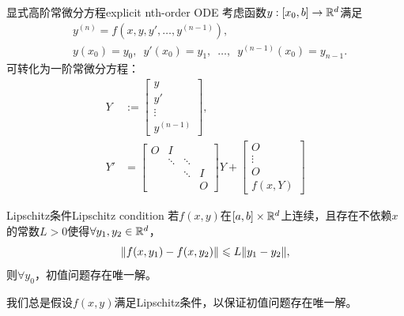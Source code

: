 \begin{definition}
    {显式高阶常微分方程}{explicit nth-order ODE}
    考虑函数$y:[x_0,b] \to \mathbb{R}^d$满足
    \begin{subequations}
        \begin{align}
            &y^{(n)} = f(x,y,y',\dots,y^{(n-1)}),\\
            &y(x_0) = y_0,\enspace y'(x_0) = y_1,\enspace\ldots,\enspace y^{(n-1)}(x_0) = y_{n-1}.
        \end{align}
    \end{subequations}
    可转化为一阶常微分方程：
    \begin{subequations}
        \begin{align}
            Y &:= \begin{bmatrix}
                y\\y'\\\vdots\\y^{(n-1)}
            \end{bmatrix},\\
            Y' &= \begin{bmatrix}
                O&I\\ &\ddots&\ddots\\ &&\ddots&I\\ &&&O
            \end{bmatrix}Y + \begin{bmatrix}
                O\\\vdots\\O\\f(x,Y)
            \end{bmatrix}
        \end{align}
    \end{subequations}
\end{definition}

\begin{theorem}
    {Lipschitz条件}{Lipschitz condition}
    若$f(x,y)$在$[a,b] \times \mathbb{R}^d$上连续，且存在不依赖$x$的常数$L > 0$使得$\forall y_1,y_2 \in \mathbb{R}^d$，
    \begin{equation}
        \lVert f(x,y_1) - f(x,y_2)\rVert \leqslant L\lVert y_1 - y_2\rVert,
    \end{equation}
    则$\forall y_0$，初值问题存在唯一解。
\end{theorem}

\begin{remark}
    我们总是假设$f(x,y)$满足Lipschitz条件，以保证初值问题存在唯一解。
\end{remark}

